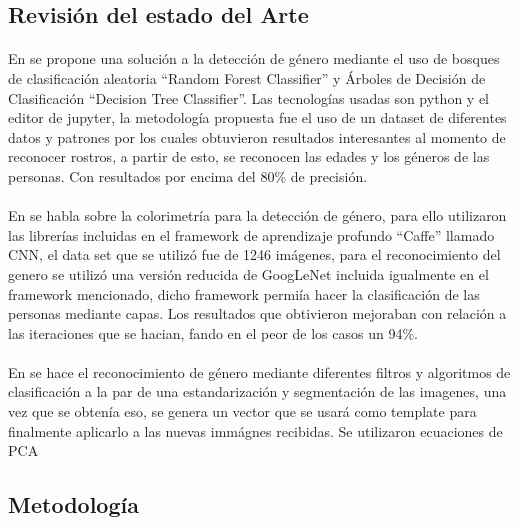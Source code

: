 \documentclass[9pt]{report}
\begin{document}
\begin{multicols}{2}
	\begin{center}
	\section*{Revisión del estado del Arte}
	\end{center}
	\paragraph{}
	En \cite{GenderDetectionIndia} se propone una solución a la detección de género mediante el uso de bosques de clasificación aleatoria ``Random Forest Classifier'' y Árboles de Decisión de Clasificación ``Decision Tree Classifier''. Las tecnologías usadas son python y el editor de jupyter, la metodología propuesta fue el uso de un dataset de diferentes datos y patrones por los cuales obtuvieron resultados interesantes al momento de reconocer rostros, a partir de esto, se reconocen las edades y los géneros de las personas. Con resultados por encima del 80\% de precisión.
	\paragraph{}
	En \cite{DeepColorization} se habla sobre la colorimetría para la detección de género, para ello utilizaron las librerías incluidas en el framework de aprendizaje profundo ``Caffe'' llamado CNN, el data set que se utilizó fue de 1246 imágenes, para el reconocimiento del genero se utilizó una versión reducida de GoogLeNet incluida igualmente en el framework mencionado, dicho framework permiía hacer la clasificación de las personas mediante capas. Los resultados que obtivieron mejoraban con relación a las iteraciones que se hacian, fando en el peor de los casos un 94\%.
	\paragraph{}
	En \cite{FacialGender} se hace el reconocimiento de género mediante diferentes filtros y algoritmos de clasificación a la par de una estandarización y segmentación de las imagenes, una vez que se obtenía eso, se genera un vector que se usará como template para finalmente aplicarlo a las nuevas immágnes recibidas. Se utilizaron ecuaciones de PCA 
	\begin{center}
		\section*{Metodología}
	\end{center}

\end{multicols}
\end{document}
